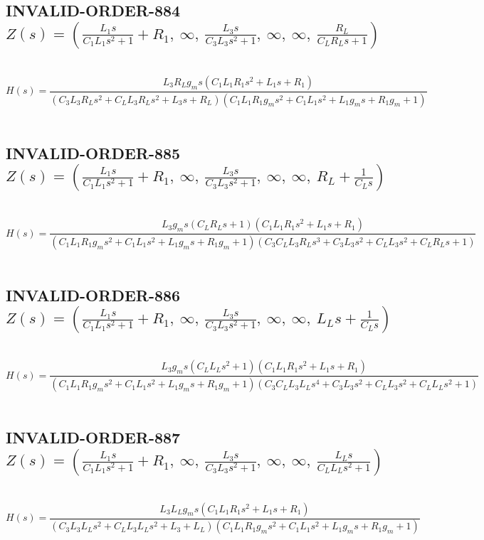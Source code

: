 \documentclass{article}
\begin{document}
\subsection{INVALID-ORDER-884 $Z(s) = \left( \frac{L_{1} s}{C_{1} L_{1} s^{2} + 1} + R_{1}, \  \infty, \  \frac{L_{3} s}{C_{3} L_{3} s^{2} + 1}, \  \infty, \  \infty, \  \frac{R_{L}}{C_{L} R_{L} s + 1}\right)$ } \ 
\textbf{\[H(s) = \frac{L_{3} R_{L} g_{m} s \left(C_{1} L_{1} R_{1} s^{2} + L_{1} s + R_{1}\right)}{\left(C_{3} L_{3} R_{L} s^{2} + C_{L} L_{3} R_{L} s^{2} + L_{3} s + R_{L}\right) \left(C_{1} L_{1} R_{1} g_{m} s^{2} + C_{1} L_{1} s^{2} + L_{1} g_{m} s + R_{1} g_{m} + 1\right)}\] } \ 
\subsection{INVALID-ORDER-885 $Z(s) = \left( \frac{L_{1} s}{C_{1} L_{1} s^{2} + 1} + R_{1}, \  \infty, \  \frac{L_{3} s}{C_{3} L_{3} s^{2} + 1}, \  \infty, \  \infty, \  R_{L} + \frac{1}{C_{L} s}\right)$ } \ 
\textbf{\[H(s) = \frac{L_{3} g_{m} s \left(C_{L} R_{L} s + 1\right) \left(C_{1} L_{1} R_{1} s^{2} + L_{1} s + R_{1}\right)}{\left(C_{1} L_{1} R_{1} g_{m} s^{2} + C_{1} L_{1} s^{2} + L_{1} g_{m} s + R_{1} g_{m} + 1\right) \left(C_{3} C_{L} L_{3} R_{L} s^{3} + C_{3} L_{3} s^{2} + C_{L} L_{3} s^{2} + C_{L} R_{L} s + 1\right)}\] } \ 
\subsection{INVALID-ORDER-886 $Z(s) = \left( \frac{L_{1} s}{C_{1} L_{1} s^{2} + 1} + R_{1}, \  \infty, \  \frac{L_{3} s}{C_{3} L_{3} s^{2} + 1}, \  \infty, \  \infty, \  L_{L} s + \frac{1}{C_{L} s}\right)$ } \ 
\textbf{\[H(s) = \frac{L_{3} g_{m} s \left(C_{L} L_{L} s^{2} + 1\right) \left(C_{1} L_{1} R_{1} s^{2} + L_{1} s + R_{1}\right)}{\left(C_{1} L_{1} R_{1} g_{m} s^{2} + C_{1} L_{1} s^{2} + L_{1} g_{m} s + R_{1} g_{m} + 1\right) \left(C_{3} C_{L} L_{3} L_{L} s^{4} + C_{3} L_{3} s^{2} + C_{L} L_{3} s^{2} + C_{L} L_{L} s^{2} + 1\right)}\] } \ 
\subsection{INVALID-ORDER-887 $Z(s) = \left( \frac{L_{1} s}{C_{1} L_{1} s^{2} + 1} + R_{1}, \  \infty, \  \frac{L_{3} s}{C_{3} L_{3} s^{2} + 1}, \  \infty, \  \infty, \  \frac{L_{L} s}{C_{L} L_{L} s^{2} + 1}\right)$ } \ 
\textbf{\[H(s) = \frac{L_{3} L_{L} g_{m} s \left(C_{1} L_{1} R_{1} s^{2} + L_{1} s + R_{1}\right)}{\left(C_{3} L_{3} L_{L} s^{2} + C_{L} L_{3} L_{L} s^{2} + L_{3} + L_{L}\right) \left(C_{1} L_{1} R_{1} g_{m} s^{2} + C_{1} L_{1} s^{2} + L_{1} g_{m} s + R_{1} g_{m} + 1\right)}\] } \ 
\end{document}
